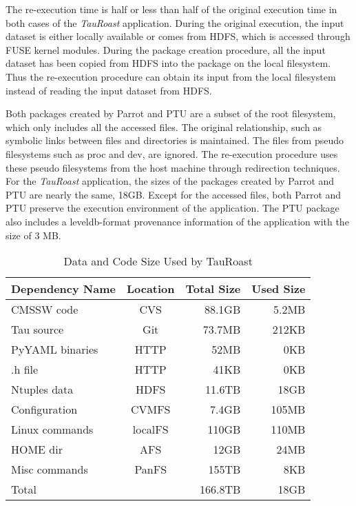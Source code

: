 The re-execution time is half or less than half of the original execution time in both cases of the \emph{TauRoast} application. During the original execution, the input dataset is either locally available or comes from HDFS, which is accessed through FUSE kernel modules. During the package creation procedure, all the input dataset has been copied from HDFS into the package on the local filesystem. Thus the re-execution procedure can obtain its input from the local filesystem instead of reading the input dataset from HDFS.

Both packages created by Parrot and PTU are a subset of the root filesystem, which only includes all the accessed files. The original relationship, such as symbolic links between files and directories is maintained. The files from pseudo filesystems such as proc and dev, are ignored. The re-execution procedure uses these pseudo filesystems from the host machine through redirection techniques.
For the \emph{TauRoast} application, the sizes of the packages created by Parrot and PTU are nearly the same, 18GB. 
Except for the accessed files, both Parrot and PTU preserve the execution environment of the application. 
The PTU package also includes a leveldb-format provenance information of the application with the size of 3 MB.

\begin{table}
\small
	\centering
	    \begin{tabular}{lcrr}
	        \hline
	        \bf Dependency Name & \bf Location & \bf Total Size &  \bf Used Size\\ 
	        \hline
	        CMSSW code     & CVS & 88.1GB &  5.2MB\\ \hline
	        Tau source       & Git & 73.7MB & 212KB \\ \hline
	        PyYAML binaries    & HTTP & 52MB& 0KB \\ \hline
	        .h file       & HTTP& 41KB & 0KB \\ \hline 
	        Ntuples data    & HDFS& 11.6TB & 18GB \\ \hline
	        Configuration & CVMFS & 7.4GB & 105MB \\ \hline
	        Linux commands & localFS & 110GB & 110MB \\ \hline     
	        HOME dir& AFS &12GB & 24MB\\ \hline
	        Misc commands & PanFS & 155TB & 8KB \\ \hline
	        Total      &    & 166.8TB     &  18GB \\ \hline
	    \end{tabular}
	    \normalsize
	    \caption{Data and Code Size Used by TauRoast}
	    \label{table:size-original-real}
\end{table}
	   
